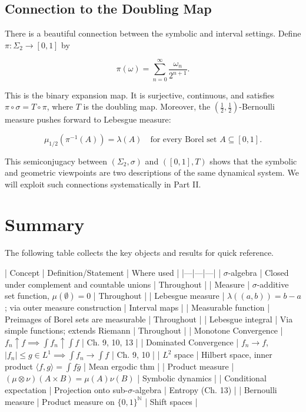 \subsection{Connection to the Doubling Map}\label{sec:7.8.4}

There is a beautiful connection between the symbolic and interval settings. Define $\pi: \Sigma_2 \to [0,1]$ by

\[
\pi(\omega) = \sum_{n=0}^{\infty} \frac{\omega_n}{2^{n+1}}.
\]

This is the binary expansion map. It is surjective, continuous, and satisfies $\pi \circ \sigma = T \circ \pi$, where $T$ is the doubling map. Moreover, the $(\frac{1}{2}, \frac{1}{2})$-Bernoulli measure pushes forward to Lebesgue measure:

\[
\mu_{1/2}(\pi^{-1}(A)) = \lambda(A) \quad \text{for every Borel set } A \subseteq [0,1].
\]

This semiconjugacy between $(\Sigma_2, \sigma)$ and $([0,1], T)$ shows that the symbolic and geometric viewpoints are two descriptions of the same dynamical system. We will exploit such connections systematically in Part II.


\bigskip


\section{Summary}\label{sec:7.9}

The following table collects the key objects and results for quick reference.

| Concept | Definition/Statement | Where used |
|---|---|---|
| $\sigma$-algebra | Closed under complement and countable unions | Throughout |
| Measure | $\sigma$-additive set function, $\mu(\emptyset) = 0$ | Throughout |
| Lebesgue measure | $\lambda((a,b)) = b-a$; via outer measure construction | Interval maps |
| Measurable function | Preimages of Borel sets are measurable | Throughout |
| Lebesgue integral | Via simple functions; extends Riemann | Throughout |
| Monotone Convergence | $f_n \uparrow f \implies \int f_n \uparrow \int f$ | Ch. 9, 10, 13 |
| Dominated Convergence | $f_n \to f$, $|f_n| \leq g \in L^1 \implies \int f_n \to \int f$ | Ch. 9, 10 |
| $L^2$ space | Hilbert space, inner product $\langle f,g\rangle = \int f\bar{g}$ | Mean ergodic thm |
| Product measure | $(\mu \otimes \nu)(A \times B) = \mu(A)\nu(B)$ | Symbolic dynamics |
| Conditional expectation | Projection onto sub-$\sigma$-algebra | Entropy (Ch. 13) |
| Bernoulli measure | Product measure on $\{0,1\}^{\mathbb{N}}$ | Shift spaces |


